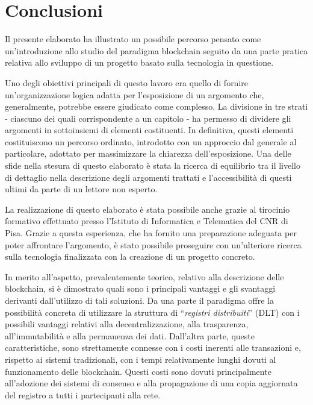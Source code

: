 \chapter{Conclusioni}

Il presente elaborato ha illustrato un possibile percorso pensato come un’introduzione allo studio del paradigma blockchain seguito da una parte pratica relativa allo sviluppo di un progetto basato sulla tecnologia in questione.

Uno degli obiettivi principali di questo lavoro era quello di fornire un'organizzazione logica adatta per l’esposizione di un argomento che, generalmente, potrebbe essere giudicato come complesso. La divisione in tre strati - ciascuno dei quali corrispondente a un capitolo - ha permesso di dividere gli argomenti in sottoinsiemi di elementi costituenti. In definitiva, questi elementi costituiscono un percorso ordinato, introdotto con un approccio dal generale al particolare, adottato per massimizzare la chiarezza dell’esposizione. Una delle sfide nella stesura di questo elaborato è stata la ricerca di equilibrio tra il livello di dettaglio nella descrizione degli argomenti trattati e l'accessibilità di questi ultimi da parte di un lettore non esperto.

La realizzazione di questo elaborato è stata possibile anche grazie al tirocinio formativo effettuato presso l’Istituto di Informatica e Telematica del CNR di Pisa. Grazie a questa esperienza, che ha fornito una preparazione adeguata per poter affrontare l'argomento, è stato possibile proseguire con un’ulteriore ricerca sulla tecnologia finalizzata con la creazione di un progetto concreto.

In merito all'aspetto, prevalentemente teorico, relativo alla descrizione delle blockchain, si è dimostrato quali sono i principali vantaggi e gli svantaggi derivanti dall'utilizzo di tali soluzioni. Da una parte il paradigma offre la possibilità concreta di utilizzare la struttura di “\emph{registri distribuiti}” (DLT) con i possibili vantaggi relativi alla decentralizzazione, alla trasparenza, all'immutabilità e alla permanenza dei dati.
Dall'altra parte, queste caratteristiche, sono strettamente connesse con i costi inerenti alle transazioni e, rispetto ai sistemi tradizionali, con i tempi relativamente lunghi dovuti al funzionamento delle blockchain. Questi costi sono dovuti principalmente all'adozione dei sistemi di consenso e alla propagazione di una copia aggiornata del registro a tutti i partecipanti alla rete.

